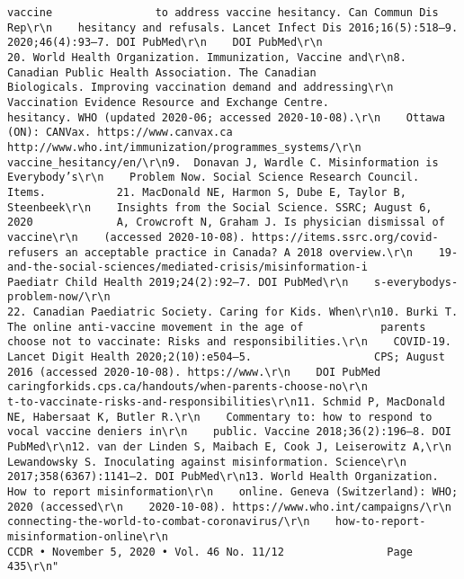 \documentclass[
]{book}
\begin{document}
\begin{verbatim}
vaccine                to address vaccine hesitancy. Can Commun Dis Rep\r\n    hesitancy and refusals. Lancet Infect Dis 2016;16(5):518–9.        2020;46(4):93–7. DOI PubMed\r\n    DOI PubMed\r\n                                                                   20. World Health Organization. Immunization, Vaccine and\r\n8.  Canadian Public Health Association. The Canadian                   Biologicals. Improving vaccination demand and addressing\r\n    Vaccination Evidence Resource and Exchange Centre.                 hesitancy. WHO (updated 2020-06; accessed 2020-10-08).\r\n    Ottawa (ON): CANVax. https://www.canvax.ca                         http://www.who.int/immunization/programmes_systems/\r\n                                                                       vaccine_hesitancy/en/\r\n9.  Donavan J, Wardle C. Misinformation is Everybody’s\r\n    Problem Now. Social Science Research Council. Items.           21. MacDonald NE, Harmon S, Dube E, Taylor B, Steenbeek\r\n    Insights from the Social Science. SSRC; August 6, 2020             A, Crowcroft N, Graham J. Is physician dismissal of vaccine\r\n    (accessed 2020-10-08). https://items.ssrc.org/covid-               refusers an acceptable practice in Canada? A 2018 overview.\r\n    19-and-the-social-sciences/mediated-crisis/misinformation-i        Paediatr Child Health 2019;24(2):92–7. DOI PubMed\r\n    s-everybodys-problem-now/\r\n                                                                   22. Canadian Paediatric Society. Caring for Kids. When\r\n10. Burki T. The online anti-vaccine movement in the age of            parents choose not to vaccinate: Risks and responsibilities.\r\n    COVID-19. Lancet Digit Health 2020;2(10):e504–5.                   CPS; August 2016 (accessed 2020-10-08). https://www.\r\n    DOI PubMed                                                         caringforkids.cps.ca/handouts/when-parents-choose-no\r\n                                                                       t-to-vaccinate-risks-and-responsibilities\r\n11. Schmid P, MacDonald NE, Habersaat K, Butler R.\r\n    Commentary to: how to respond to vocal vaccine deniers in\r\n    public. Vaccine 2018;36(2):196–8. DOI PubMed\r\n12. van der Linden S, Maibach E, Cook J, Leiserowitz A,\r\n    Lewandowsky S. Inoculating against misinformation. Science\r\n    2017;358(6367):1141–2. DOI PubMed\r\n13. World Health Organization. How to report misinformation\r\n    online. Geneva (Switzerland): WHO; 2020 (accessed\r\n    2020-10-08). https://www.who.int/campaigns/\r\n    connecting-the-world-to-combat-coronavirus/\r\n    how-to-report-misinformation-online\r\n                                                                CCDR • November 5, 2020 • Vol. 46 No. 11/12                Page 435\r\n"

\end{verbatim}
\end{document}
